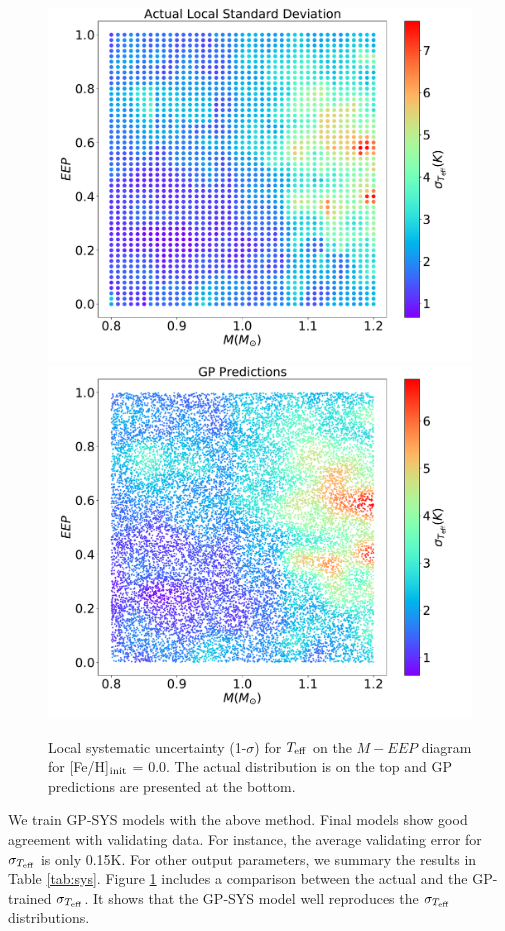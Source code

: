 \begin{figure}
	\includegraphics[width=1.0\columnwidth]{5d_sys_teff.pdf}
	\includegraphics[width=1.0\columnwidth]{5d_sys_effective_T_std_predictions.pdf}
    \caption{Local systematic uncertainty (1-$\sigma$) for $T_{\rm eff}$ on the $M - EEP$ diagram for [Fe/H]$_{\rm init}$ = 0.0. The actual distribution is on the top and GP predictions are presented at the bottom.} 
  \label{fig:5d_sys_teff}
\end{figure}

We train GP-SYS models with the above method. Final models show good agreement with validating data. For instance, the average validating error for $\sigma_{T_{\rm eff}}$ is only 0.15K. For other output parameters, we summary the results in Table \ref{tab:sys}.
%
Figure \ref{fig:5d_sys_teff} includes a comparison between the actual and the GP-trained $\sigma_{T_{\rm eff}}$. It shows that the GP-SYS model well reproduces the $\sigma_{T_{\rm eff}}$ distributions. 

